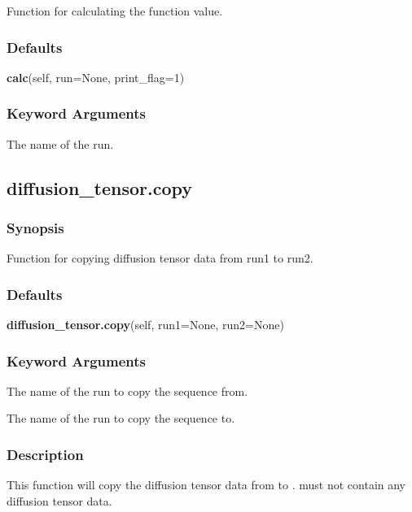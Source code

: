 Function for calculating the function value.

\subsubsection{Defaults}

\textsf{\textbf{calc}(self, run=None, print\_flag=1)}


\subsubsection{Keyword Arguments}


  The name of the run.


\newpage

\subsection{diffusion\_tensor.copy}


\subsubsection{Synopsis}

Function for copying diffusion tensor data from run1 to run2.

\subsubsection{Defaults}

\textsf{\textbf{diffusion\_tensor.copy}(self, run1=None, run2=None)}


\subsubsection{Keyword Arguments}


  The name of the run to copy  the sequence  from.

  The name of the run to copy  the sequence  to.

\subsubsection{Description}

This function will copy  the diffusion tensor  data from 
 to 
.  
 must not
contain any diffusion tensor  data.


